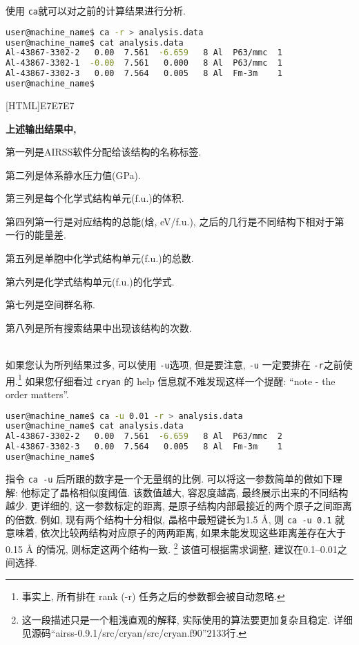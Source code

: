 \documentclass[a4paper, 10pt]{article}
\begin{document}
使用 \verb|ca|就可以对之前的计算结果进行分析.
\begin{lstlisting}[language={bash}]
user@machine_name$ ca -r > analysis.data
user@machine_name$ cat analysis.data
Al-43867-3302-2   0.00  7.561  -6.659   8 Al  P63/mmc  1
Al-43867-3302-1  -0.00  7.561   0.000   8 Al  P63/mmc  1
Al-43867-3302-3   0.00  7.564   0.005   8 Al  Fm-3m    1
user@machine_name$
\end{lstlisting}

\noindent{}[HTML]{E7E7E7}{\parbox{\textwidth}{%
\noindent \textbf{上述输出结果中,}
\begin{maineu}
  \item 第一列是AIRSS软件分配给该结构的名称标签.
  \item 第二列是体系静水压力值(GPa).
  \item 第三列是每个化学式结构单元(f.u.)的体积.
  \item 第四列第一行是对应结构的总能(焓, eV/f.u.), 之后的几行是不同结构下相对于第一行的能量差.
  \item 第五列是单胞中化学式结构单元(f.u.)的总数.
  \item 第六列是化学式结构单元(f.u.)的化学式.
  \item 第七列是空间群名称.
  \item 第八列是所有搜索结果中出现该结构的次数.
\end{maineu}}}\\

如果您认为所列结果过多, 可以使用 \verb|-u|选项, 但是要注意, \verb|-u| 一定要排在 \verb|-r|之前使用.\footnote{事实上, 所有排在 rank (-r) 任务之后的参数都会被自动忽略.} 如果您仔细看过 \verb|cryan| 的 help 信息就不难发现这样一个提醒: ``note - the order matters''.
\begin{lstlisting}[language={bash}]
user@machine_name$ ca -u 0.01 -r > analysis.data
user@machine_name$ cat analysis.data
Al-43867-3302-2   0.00  7.561  -6.659   8 Al  P63/mmc  2
Al-43867-3302-3   0.00  7.564   0.005   8 Al  Fm-3m    1
user@machine_name$
\end{lstlisting}

指令 \verb|ca -u| 后所跟的数字是一个无量纲的比例. 可以将这一参数简单的做如下理解:  他标定了晶格相似度阈值. 该数值越大, 容忍度越高, 最终展示出来的不同结构越少. 更详细的, 这一参数标定的距离, 是原子结构内部最接近的两个原子之间距离的倍数. 例如, 现有两个结构十分相似, 晶格中最短键长为1.5 \r{A}, 则 \verb|ca -u 0.1| 就意味着, 依次比较两结构对应原子的两两距离, 如果未能发现这些距离差存在大于0.15 \r{A} 的情况, 则标定这两个结构一致. \footnote{这一段描述只是一个粗浅直观的解释, 实际使用的算法要更加复杂且稳定. 详细见源码``airss-0.9.1/src/cryan/src/cryan.f90''2133行.} 该值可根据需求调整, 建议在0.1--0.01之间选择.
\end{document}
